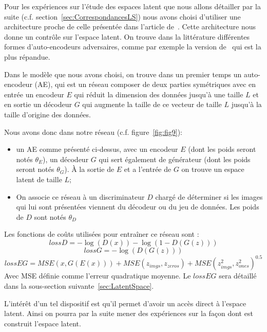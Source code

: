 \documentclass[11pt,francais]{article}
\begin{document}
Pour les expériences sur l'étude des espaces latent que nous allons détailler par la suite (c.f. section~\ref{sec:CorrespondancesLS}) nous avons choisi d'utiliser une architecture proche de celle présentée dans l'article de~\cite{GADAE}. Cette architecture nous donne un contrôle sur l'espace latent.
On trouve dans la littérature différentes formes d'auto-encodeurs adversaires, comme par exemple la version de~\cite{makhzani2015adversarial} qui est la plus répandue.

Dans le modèle que nous avons choisi, on trouve dans un premier temps un auto-encodeur (AE), qui est un réseau composer de deux parties symétriques avec en entrée un encodeur \(E\) qui réduit la dimension des données jusqu'à une taille \(L\) et en sortie un décodeur \(G\) qui augmente la taille de ce vecteur de taille \(L\) jusqu'à la taille d'origine des données. 

Nous avons donc dans notre réseau (c.f. figure~\ref{fig:fig9}):
\begin{itemize}
  \item un AE comme présenté ci-dessus, avec un encodeur \(E\) (dont les poids seront notés \(\theta_E\)), un décodeur \(G\) qui sert également de générateur (dont les poids seront notés \(\theta_G\)). À la sortie de \(E\) et a l'entrée de \(G\) on trouve un espace latent de taille \(L\);
  \item On associe ce réseau à un discriminateur \(D\) chargé de déterminer si les images qui lui sont présentées viennent du décodeur ou du jeu de données. Les poids de \(D\) sont notés \(\theta_D\) 
\end{itemize}
Les fonctions de coûts utilisées pour entraîner ce réseau sont :
\[
lossD = -\log(D(x)) - \log(1-D(G(z)))
\]
\[
lossG = -\log(D(G(z)))
\]
\[
lossEG = MSE(x, G(E(x))) + MSE(z_{imgs}, z_{zeros}) + MSE(z_{imgs}^2, z_{ones}^2)^{0.5}
\]
Avec MSE définie comme l'erreur quadratique moyenne.
Le \(lossEG\) sera détaillé dans la sous-section suivante~\ref{sec:LatentSpace}.

L'intérêt d'un tel dispositif est qu'il permet d'avoir un accès direct à l'espace latent. Ainsi on pourra par la suite mener des expériences sur la façon dont est construit l'espace latent.
\end{document}
